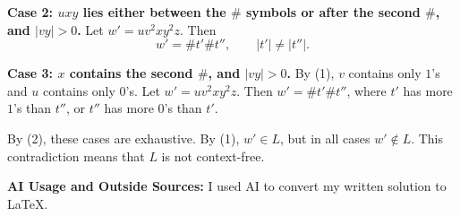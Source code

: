 \documentclass{article}
\theoremstyle{definition}
\newenvironment {solution}
{
\begin{tcolorbox}[breakable]
}
{
\end{tcolorbox}
}
\begin{document}
\begin{enumerate}
\begin{solution}
\medskip
\textbf{Case 2: $uxy$ lies either between the $\#$ symbols or after the
second $\#$, and $|vy| > 0$.}
Let $w' = uv^2xy^2z$. Then
\[
    w' = \#t'\#t'', \qquad |t'| \neq |t''|.
\]

\medskip
\textbf{Case 3: $x$ contains the second $\#$, and $|vy| > 0$.}
By (1), $v$ contains only $1$'s and $u$ contains only $0$'s.
Let $w' = uv^2xy^2z$. Then $w' = \#t'\#t''$, where $t'$ has more $1$'s
than $t''$, or $t''$ has more $0$'s than $t'$.

\medskip
By (2), these cases are exhaustive. By (1), $w' \in L$, but in all cases
$w' \notin L$. This contradiction means that $L$ is not context-free.

\vspace{0.5cm}

\textbf{AI Usage and Outside Sources:} I used AI to convert my written
solution to LaTeX.
\end{solution}

\end{enumerate}
\end{document}
